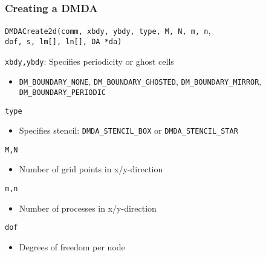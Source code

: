 \begin{frame}[fragile]
\frametitle{Creating a DMDA}

{\small \lstinline|DMDACreate2d(comm, xbdy, ybdy, type, M, N, m, n|, \\
\qquad\qquad\qquad \qquad  \lstinline|dof, s, lm[], ln[], DA *da)|}

\begin{block}{\lstinline|xbdy,ybdy|: Specifies periodicity or ghost cells}
  \vspace*{-0.2cm}
  \begin{itemize}
    \item \lstinline|DM_BOUNDARY_NONE|, \lstinline|DM_BOUNDARY_GHOSTED|, \lstinline|DM_BOUNDARY_MIRROR|, \lstinline|DM_BOUNDARY_PERIODIC|
  \end{itemize}
\end{block}

\vspace*{-0.3cm}
\begin{block}{\lstinline|type|}
  \vspace*{-0.2cm}
  \begin{itemize}
    \item Specifies stencil: \lstinline|DMDA_STENCIL_BOX| or \lstinline|DMDA_STENCIL_STAR|
  \end{itemize}
\end{block}

\vspace*{-0.3cm}
\begin{block}{\lstinline|M,N|}
  \vspace*{-0.2cm}
  \begin{itemize}
    \item Number of grid points in x/y-direction
  \end{itemize}
\end{block}

\vspace*{-0.3cm}
\begin{block}{\lstinline|m,n|}
  \vspace*{-0.2cm}
  \begin{itemize}
    \item Number of processes in x/y-direction
  \end{itemize}
\end{block}

\vspace*{-0.3cm}
\begin{block}{\lstinline|dof|}
  \vspace*{-0.2cm}
  \begin{itemize}
    \item Degrees of freedom per node
  \end{itemize}
\end{block}


\end{frame}
